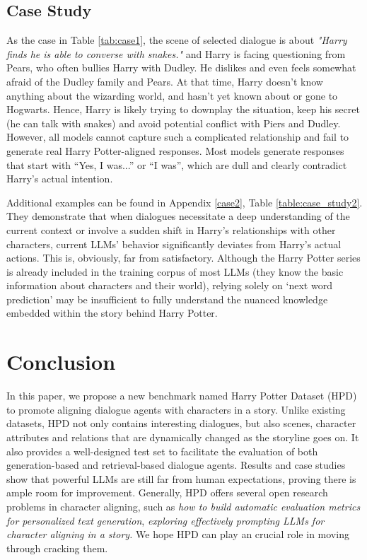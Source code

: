 \documentclass[11pt]{article}
\begin{document}
 
\subsection{Case Study}
\label{case_study}








As the case in Table \ref{tab:case1}, the scene of selected dialogue is about \textit{"Harry finds he is able to converse with snakes."} and Harry is facing questioning from Pears, who often bullies Harry with Dudley. He dislikes and even feels somewhat afraid of the Dudley family and Pears.
At that time, Harry doesn't know anything about the wizarding world, and hasn't yet known about or gone to Hogwarts. 
Hence, Harry is likely trying to downplay the situation, keep his secret (he can talk with snakes) and avoid potential conflict with Piers and Dudley. 
However, all models cannot capture such a complicated relationship and fail to generate real Harry Potter-aligned responses. Most models generate responses that start with ``Yes, I was...'' or ``I was'', which are dull and clearly contradict Harry's actual intention. 


Additional examples can be found in Appendix \ref{case2}, Table \ref{table:case_study2}. They demonstrate that when dialogues necessitate a deep understanding of the current context or involve a sudden shift in Harry's relationships with other characters, current LLMs' behavior significantly deviates from Harry's actual actions. This is, obviously, far from satisfactory. Although the Harry Potter series is already included in the training corpus of most LLMs (they know the basic information about characters and their world), relying solely on `next word prediction' may be insufficient to fully understand the nuanced knowledge embedded within the story behind Harry Potter.





%
 \section{Conclusion}
\label{conclusion}
In this paper, we propose a new benchmark named Harry Potter Dataset (HPD) to promote aligning
dialogue agents with characters in a story.
Unlike existing  datasets, HPD not only contains interesting dialogues, but also scenes, character attributes and relations that are dynamically changed as the storyline goes on. It also provides  a well-designed test set to facilitate the evaluation of both generation-based and retrieval-based dialogue agents. 
Results and case studies show that powerful LLMs 
 are still far from human expectations, proving there is ample room for improvement.
Generally,
HPD offers several open research problems in character aligning, such as \textit{how to build automatic evaluation metrics for personalized text generation}, \textit{exploring effectively prompting LLMs for character aligning in a story.} We hope HPD can play an crucial role in moving through cracking them.
\end{document}
